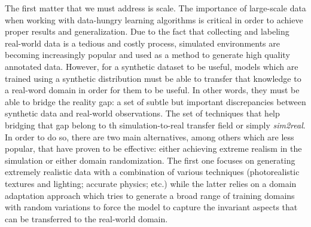 The first matter that we must address is scale. The importance of large-scale data when working with data-hungry learning algorithms is critical in order to achieve proper results and generalization. Due to the fact that collecting and labeling real-world data is a tedious and costly process, simulated environments are becoming increasingly popular and used as a method to generate high quality annotated data. However, for a synthetic dataset to be useful, models which are trained using a synthetic distribution must be able to transfer that knowledge to a real-word domain in order for them to be useful. In other words, they must be able to bridge the reality gap: a set of subtle but important discrepancies between synthetic data and real-world observations. The set of techniques that help bridging that gap belong to th simulation-to-real transfer field or simply \emph{sim2real}. In order to do so, there are two main alternatives, among others which are less popular, that have proven to be effective: either achieving extreme realism in the simulation or either domain randomization. The first one focuses on generating extremely realistic data with a combination of various techniques (photorealistic textures and lighting; accurate physics; etc.) while the latter relies on a domain adaptation approach which tries to generate a broad range of training domains with random variations to force the model to capture the invariant aspects that can be transferred to the real-world domain. 

\clearpage

